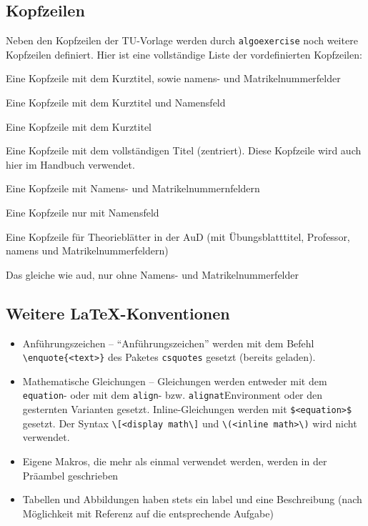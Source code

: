 \documentclass[
    titleprefix=AlgoTeX,
    inlineshortcut=java,
    corporatedesign,
    boxarc,
]{algoexercise}
\begin{document}
    \subsection{Kopfzeilen}
    Neben den Kopfzeilen der TU-Vorlage werden durch \verb+algoexercise+ noch weitere Kopfzeilen definiert.
    Hier ist eine vollständige Liste der vordefinierten Kopfzeilen:
    \begin{description}[leftmargin=3cm]
        \item[title-name-id] Eine
            Kopfzeile mit dem Kurztitel, sowie namens- und Matrikelnummerfelder
        \item[title-name] Eine Kopfzeile mit dem Kurztitel und
            Namensfeld
        \item[title] Eine Kopfzeile mit dem Kurztitel
        \item[fulltitle-centered] Eine Kopfzeile mit dem vollständigen Titel
            (zentriert).
            Diese Kopfzeile wird auch hier im Handbuch verwendet.
        \item[name-id] Eine Kopfzeile mit Namens- und Matrikelnummernfeldern
        \item[name] Eine Kopfzeile nur mit Namensfeld
        \item[aud] Eine Kopfzeile für Theorieblätter in der AuD (mit Übungsblatttitel, Professor, namens und
            Matrikelnummerfeldern)
        \item[aud-min] Das gleiche wie aud, nur ohne Namens- und Matrikelnummerfelder
    \end{description}
    \subsection{Weitere \LaTeX-Konventionen}
    \begin{itemize}
        \item Anführungszeichen -- \enquote{Anführungszeichen} werden mit dem Befehl \verb+\enquote{<text>}+ des Paketes
            \verb+csquotes+
            gesetzt (bereits geladen).
        \item Mathematische Gleichungen -- Gleichungen werden entweder mit dem \verb+equation+- oder mit dem \verb+align+- bzw.
            \verb+alignat+Environment oder den gesternten Varianten gesetzt.
            Inline-Gleichungen werden mit \verb+$<equation>$+ gesetzt.
            Der Syntax \verb+\[<display math\]+ und \verb+\(<inline math>\)+ wird nicht verwendet.
        \item Eigene Makros, die mehr als einmal verwendet werden, werden in der Präambel geschrieben
        \item Tabellen und Abbildungen haben stets ein label und eine Beschreibung (nach Möglichkeit mit Referenz auf die
            entsprechende Aufgabe)
    \end{itemize}
    \clearpage{}
\end{document}
